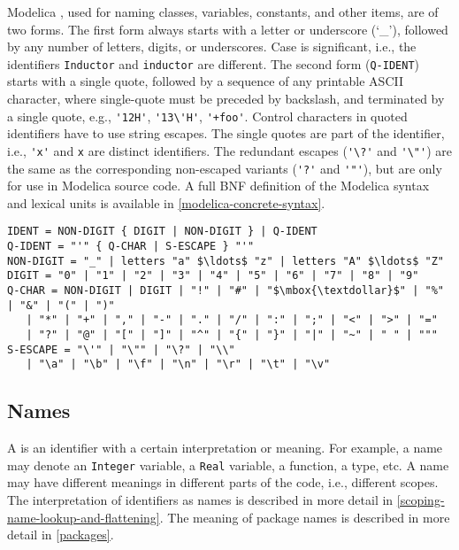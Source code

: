 Modelica , used for naming classes, variables, constants, and other items, are of two forms.
The first form always starts with a letter or underscore (`\_'), followed by any number of letters, digits, or underscores.
Case is significant, i.e., the identifiers \lstinline!Inductor! and \lstinline!inductor! are different.
The second form (\lstinline[language=grammar]!Q-IDENT!) starts with a single quote, followed by a sequence of any printable ASCII character, where single-quote must be preceded by backslash, and terminated by a single quote, e.g., \lstinline!'12H'!, \lstinline!'13\'H'!, \lstinline!'+foo'!.
Control characters in quoted identifiers have to use string escapes.
The single quotes are part of the identifier, i.e., \lstinline!'x'! and \lstinline!x! are distinct identifiers.
The redundant escapes (\lstinline!'\?'! and \lstinline!'\"'!) are the same as the corresponding non-escaped variants (\lstinline!'?'! and \lstinline!'"'!), but are only for use in Modelica source code.
A full BNF definition of the Modelica syntax and lexical units is available in \cref{modelica-concrete-syntax}.

\begin{lstlisting}[language=grammar]
IDENT = NON-DIGIT { DIGIT | NON-DIGIT } | Q-IDENT
Q-IDENT = "'" { Q-CHAR | S-ESCAPE } "'"
NON-DIGIT = "_" | letters "a" $\ldots$ "z" | letters "A" $\ldots$ "Z"
DIGIT = "0" | "1" | "2" | "3" | "4" | "5" | "6" | "7" | "8" | "9"
Q-CHAR = NON-DIGIT | DIGIT | "!" | "#" | "$\mbox{\textdollar}$" | "%" | "&" | "(" | ")"
   | "*" | "+" | "," | "-" | "." | "/" | ":" | ";" | "<" | ">" | "="
   | "?" | "@" | "[" | "]" | "^" | "{" | "}" | "|" | "~" | " " | """
S-ESCAPE = "\'" | "\"" | "\?" | "\\"
   | "\a" | "\b" | "\f" | "\n" | "\r" | "\t" | "\v"
\end{lstlisting}


\subsection{Names}\label{names}

A  is an identifier with a certain interpretation or meaning.
For example, a name may denote an \lstinline!Integer! variable, a \lstinline!Real! variable, a function, a type, etc.
A name may have different meanings in different parts of the code, i.e., different scopes.
The interpretation of identifiers as names is described in more detail in \cref{scoping-name-lookup-and-flattening}.
The meaning of package names is described in more detail in \cref{packages}.


